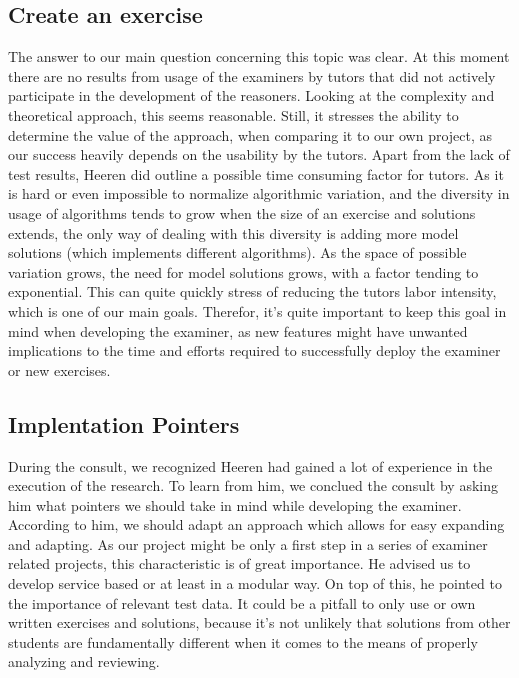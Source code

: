 \subsection{Create an exercise}
The answer to our main question concerning this topic was clear. At this moment
there are no results from usage of the examiners by tutors that did not
actively participate in the development of the reasoners. Looking at the 
complexity and theoretical approach, this seems reasonable. Still, it stresses
the ability to determine the value of the approach, when comparing it to our 
own project, as our success heavily depends on the usability by the tutors. 
Apart from the lack of test results, Heeren did outline a possible time
consuming factor for tutors. As it is hard or even impossible to normalize 
algorithmic variation, and the diversity in usage of algorithms tends to
grow when the size of an exercise and solutions extends, the only way of 
dealing with this diversity is adding more model solutions (which implements
different algorithms). %
As the space of possible variation grows, the need
for model solutions grows, with a factor tending to exponential. This can 
quite quickly stress of reducing the tutors labor intensity, which is one 
of our main goals. Therefor, it's quite important to keep this goal in mind
when developing the examiner, as new features might have unwanted implications 
to the time and efforts required to successfully deploy the \gls{examiner} or
new \gls{exercises}.

\subsection{Implentation Pointers}
During the consult, we recognized Heeren had gained a lot of experience in the
execution of the research. To learn from him, we conclued the consult by 
asking him what pointers we should take in mind while developing the 
\gls{examiner}. According to him, we should adapt an approach which allows for 
easy expanding and adapting. As our project might be only a first step in a
series of \gls{examiner} related projects, this characteristic is of great 
importance. He advised us to develop service based or at least in a modular 
way. On top of this, he pointed to the importance of relevant test data. It
could be a pitfall to only use or own written exercises and solutions, because
it's not unlikely that solutions from other students are fundamentally 
different when it comes to the means of properly analyzing and reviewing.

